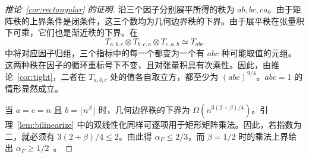 \begin{proof}[推论~\ref{cor:rectangular} 的证明]
沿三个因子分别展平所得的秩为 \(ab,bc,ca\)。由于矩阵秩的上界条件是闭条件，这三个数均为几何边界秩的下界。由于展平秩在张量积下可乘，它们也是渐近秩的下界。在
\[
            T_{a,b,c}\otimes T_{b,c,a}\otimes T_{c,a,b}
                                \simeq T_{abc}
\]
中将对应因子归组，三个指标中的每一个都变为一个有 \(abc\) 种可能取值的元组。这两种秩在因子的循环重标号下不变，且对张量积具有次乘性。因此，由推论~\ref{cor:tight}，二者在 \(T_{a,b,c}\) 处的值各自取立方，都至少为 \((abc)^{9/4}\)。\(abc=1\) 的情形显然成立。

当 \(a=c=n\) 且 \(b=\lfloor n^\beta\rfloor\) 时，几何边界秩的下界为 \(\Omega(n^{3(2+\beta)/4})\)。引理~\ref{lem:bilinearize} 中的双线性化同样可逐项用于矩形矩阵乘法。因此，若指数为二，就必须有 \(3(2+\beta)/4\le2\)。由此得 \(\alpha_F\le2/3\)，而 \(\beta=1/2\) 时的乘法上界给出 \(\alpha_F\ge1/2\)~\cite{abvz}。
\end{proof}
